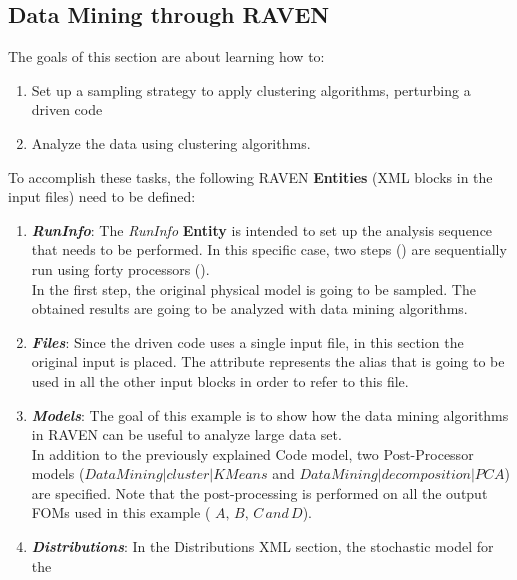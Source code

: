 \subsection{Data Mining through RAVEN}
\label{subsub:DMraven}
The goals of this section are about learning how to:
 \begin{enumerate}
   \item Set up a sampling strategy to apply clustering algorithms, perturbing a driven code
  \item Analyze the data using clustering algorithms.
\end{enumerate}
To accomplish these tasks, the following RAVEN \textbf{Entities} (XML blocks in the input files) need to be defined:
\begin{enumerate}
   \item \textbf{\textit{RunInfo}}:
   The \textit{RunInfo} \textbf{Entity} is intended  to set up the analysis sequence that
   needs to be performed. In this specific case, two steps  () are sequentially run
   using forty processors ().
   \\In the first step, the original physical model is going to be sampled.
   The obtained results are going to be analyzed with data mining
   algorithms.
   \item \textbf{\textit{Files}}:
   Since the driven code uses a single input file, in this section the original input is placed. The attribute   represents the alias that is going to be
   used in all the other input blocks in order to refer to this file.
   \item \textbf{\textit{Models}}:
 The goal of this example is to show how the
 data mining algorithms in RAVEN can be useful to analyze large data set.
 \\In addition to the previously explained Code
 model, two Post-Processor models ($DataMining|cluster|KMeans$ and $DataMining|decomposition|PCA$) are specified.
Note that the post-processing is
performed on all the output FOMs used in this example ( $A,\, B,\, C \, and \, D$).
   \item \textbf{\textit{Distributions}}:
  In the Distributions XML section, the stochastic model for the

\end{enumerate}
